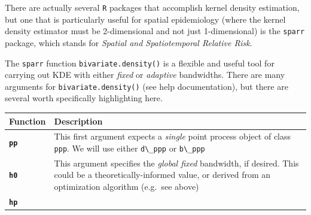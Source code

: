 \documentclass[
]{book}
\newcommand{\passthrough}[1]{#1}
\begin{document}
There are actually several \passthrough{\lstinline!R!} packages that accomplish kernel density estimation, but one that is particularly useful for spatial epidemiology (where the kernel density estimator must be 2-dimensional and not just 1-dimensional) is the \passthrough{\lstinline!sparr!} package, which stands for \emph{Spatial and Spatiotemporal Relative Risk}.

The \passthrough{\lstinline!sparr!} function \passthrough{\lstinline!bivariate.density()!} is a flexible and useful tool for carrying out KDE with either \emph{fixed} or \emph{adaptive} bandwidths. There are many arguments for \passthrough{\lstinline!bivariate.density()!} (see help documentation), but there are several worth specifically highlighting here.

\begin{longtable}[]{@{}ll@{}}
\toprule
\begin{minipage}[b]{0.16\columnwidth}\raggedright
Function\strut
\end{minipage} & \begin{minipage}[b]{0.78\columnwidth}\raggedright
Description\strut
\end{minipage}\tabularnewline
\midrule
\endhead
\begin{minipage}[t]{0.16\columnwidth}\raggedright
\textbf{\passthrough{\lstinline!pp!}}\strut
\end{minipage} & \begin{minipage}[t]{0.78\columnwidth}\raggedright
This first argument expects a \emph{single} point process object of class \passthrough{\lstinline!ppp!}. We will use either \passthrough{\lstinline!d\_ppp!} or \passthrough{\lstinline!b\_ppp!}\strut
\end{minipage}\tabularnewline
\begin{minipage}[t]{0.16\columnwidth}\raggedright
\textbf{\passthrough{\lstinline!h0!}}\strut
\end{minipage} & \begin{minipage}[t]{0.78\columnwidth}\raggedright
This argument specifies the \emph{global fixed} bandwidth, if desired. This could be a theoretically-informed value, or derived from an optimization algorithm (e.g.~see above)\strut
\end{minipage}\tabularnewline
\begin{minipage}[t]{0.16\columnwidth}\raggedright
\textbf{\passthrough{\lstinline!hp!}}\strut
\end{minipage} & \begin{minipage}[t]{0.78\columnwidth}\raggedright

\end{minipage}
\end{longtable}
\end{document}
